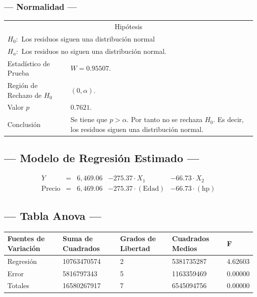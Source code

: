 \subsubsection{--- Normalidad ---} %
\begin{center}
  \begin{tabular}{|l|p{8cm}|}
    \cline{1-2}
    \multicolumn{2}{|c|}{Hipótesis}\\ \cline{1-2}
    \multicolumn{2}{|l|}{\(H_0:\) Los residuos siguen una distribución normal} \\ 
    \multicolumn{2}{|l|}{\(H_a:\) Los residuos no siguen una distribución normal.} \\ \cline{1-2}
    Estadístico de Prueba & \(W = 0.95507\).\\ \cline{1-2} 
		Región de Rechazo de \(H_0\) & \((0, \alpha )\).\\ \cline{1-2} 
    Valor \(p\) & \(0.7621\).\\ \cline{1-2} 
    Conclusión & Se tiene que \(p> \alpha\). \newline 
		Por tanto no se rechaza \(H_0\). \newline 
		Es decir, los residuos siguen una distribución normal.\\ \cline{1-2} 
  \end{tabular}
\end{center}


\subsection{\centering --- Modelo de Regresión Estimado ---} %
\begin{align}
	Y & = &              6,469.06 & - 275.37 \cdot X_1           & - 66.73     \cdot X_2   \\[2mm]
	\mbox{Precio} & = &  6,469.06 & - 275.37 \cdot (\mbox{Edad}) & - 66.73     \cdot (\mbox{hp})
	\label{eq:5}
\end{align}

\subsection{\centering --- Tabla Anova ---} %
\begin{center}
  \begin{tabular}{|l|l|l|l|l|}
    \hline 
    Fuentes de Variación  & Suma de Cuadrados & Grados de Libertad & Cuadrados Medios & F\\ \hline 
Regresión  & 10763470574          &  2       & 5381735287 & 4.62603\\ \hline
Error      &  5816797343          &  5       & 1163359469 & 0.00000\\ \hline
Totales    & 16580267917          &  7       & 6545094756 & 0.00000\\ \hline
  \end{tabular}
\end{center} 

